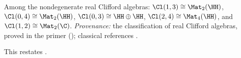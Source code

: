 Among the nondegenerate real Clifford algebras: $\Cl(1,3) \cong \Mat_2(\HH)$, $\Cl(0,4) \cong \Mat_2(\HH)$, $\Cl(0,3) \cong \HH \oplus \HH$, $\Cl(2,4) \cong \Mat_4(\HH)$, and $\Cl(1,2) \cong \Mat_2(\C)$. \emph{Provenance:} the classification of real Clifford algebras, proved in the primer \cite[Thm.~9.3]{ButlerT0} (); classical references \cite{Porteous1995, Lounesto2001}.

This restates .

